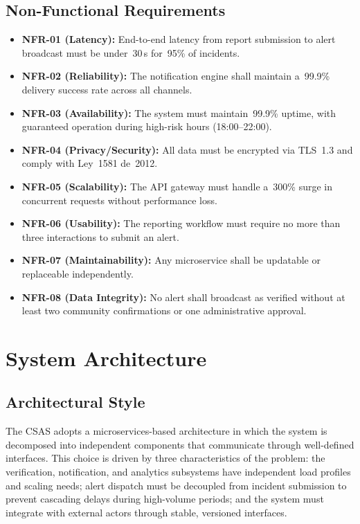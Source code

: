 \documentclass[10pt,twocolumn]{article}
\begin{document}
\subsection{Non-Functional Requirements}

\begin{itemize}[leftmargin=*, itemsep=1pt, topsep=2pt]
\item \textbf{NFR-01 (Latency):} End-to-end latency from report
submission to alert broadcast must be under~30\,s for~95\% of incidents.
\item \textbf{NFR-02 (Reliability):} The notification engine shall
maintain a~99.9\% delivery success rate across all channels.
\item \textbf{NFR-03 (Availability):} The system must maintain~99.9\%
uptime, with guaranteed operation during high-risk hours (18:00--22:00).
\item \textbf{NFR-04 (Privacy/Security):} All data must be encrypted
via TLS~1.3 and comply with Ley~1581 de~2012.
\item \textbf{NFR-05 (Scalability):} The API gateway must handle
a~300\% surge in concurrent requests without performance loss.
\item \textbf{NFR-06 (Usability):} The reporting workflow must require
no more than three interactions to submit an alert.
\item \textbf{NFR-07 (Maintainability):} Any microservice shall be
updatable or replaceable independently.
\item \textbf{NFR-08 (Data Integrity):} No alert shall broadcast as
verified without at least two community confirmations or one
administrative approval.
\end{itemize}

\section{System Architecture}

\subsection{Architectural Style}

The CSAS adopts a microservices-based architecture in which the system
is decomposed into independent components that communicate through
well-defined interfaces. This choice is driven by three characteristics
of the problem: the verification, notification, and analytics subsystems
have independent load profiles and scaling needs; alert dispatch must be
decoupled from incident submission to prevent cascading delays during
high-volume periods; and the system must integrate with external actors
through stable, versioned interfaces.
\end{document}

